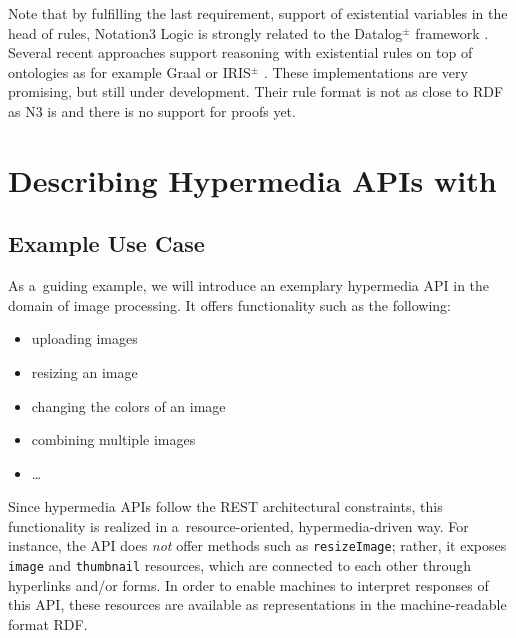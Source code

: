 
Note that by fulfilling the last requirement, support of existential variables in the head of rules, Notation3 Logic is strongly 
related to 
the Datalog$^{\pm}$ framework \cite{datalogpm,exrules}.
Several recent approaches support reasoning with existential rules on top of  ontologies as for example 
Graal \cite{graal} or IRIS$^\pm$ \cite{irispm}. These implementations are very promising, but still under development. Their rule format is
not as close to RDF as N3 is
and there is no support for proofs yet.




















\section{Describing Hypermedia APIs with \restdesc}
\label{sec:RESTdesc}
\subsection{Example Use Case}\label{usecase}
As a~guiding example, we will introduce an exemplary hypermedia API
in the domain of image processing.
It offers functionality such as the following:
\begin{itemize}
  \item uploading images
  \item resizing an image
  \item changing the colors of an image
  \item combining multiple images
  \item \ldots
\end{itemize}
Since hypermedia APIs follow the REST architectural constraints,
this functionality is realized in a~resource-oriented, hypermedia-driven way.
For instance, the API does \emph{not} offer methods such as \verb!resizeImage!;
rather, it exposes \verb!image! and \verb!thumbnail! resources,
which are connected to each other through hyperlinks and/or forms.
In order to enable machines to interpret responses of this API,
these resources are available as representations in the machine-readable format RDF.

